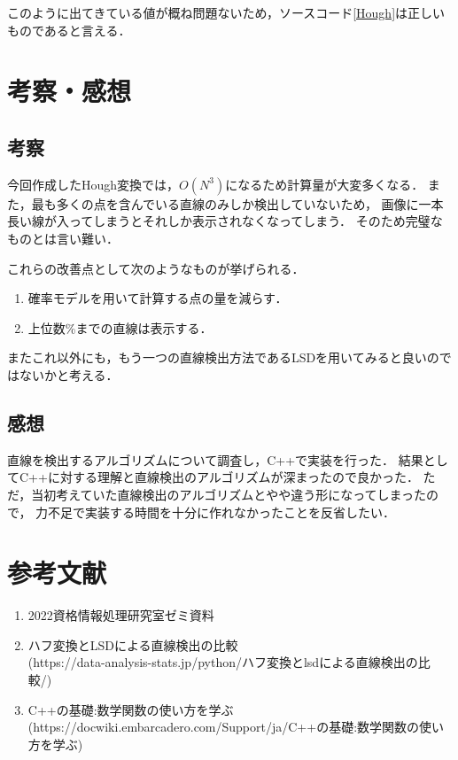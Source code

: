 \documentclass[titlepage]{jarticle}
\begin{document}
このように出てきている値が概ね問題ないため，ソースコード\ref{Hough}は正しいものであると言える．

\section{考察・感想}
\subsection{考察}
今回作成したHough変換では，$O(N^{3})$になるため計算量が大変多くなる．
また，最も多くの点を含んでいる直線のみしか検出していないため，
画像に一本長い線が入ってしまうとそれしか表示されなくなってしまう．
そのため完璧なものとは言い難い．

これらの改善点として次のようなものが挙げられる．
\begin{enumerate}
  \item 確率モデルを用いて計算する点の量を減らす．
  \item 上位数\%までの直線は表示する．
\end{enumerate}

またこれ以外にも，もう一つの直線検出方法であるLSDを用いてみると良いのではないかと考える．

\subsection{感想}
直線を検出するアルゴリズムについて調査し，C++で実装を行った．
結果としてC++に対する理解と直線検出のアルゴリズムが深まったので良かった．
ただ，当初考えていた直線検出のアルゴリズムとやや違う形になってしまったので，
力不足で実装する時間を十分に作れなかったことを反省したい．

\section*{参考文献}
\begin{enumerate}
  \item 2022資格情報処理研究室ゼミ資料
  \item ハフ変換とLSDによる直線検出の比較\\
        (https://data-analysis-stats.jp/python/ハフ変換とlsdによる直線検出の比較/)
  \item C++の基礎:数学関数の使い方を学ぶ\\
        (https://docwiki.embarcadero.com/Support/ja/C++の基礎:数学関数の使い方を学ぶ)
\end{enumerate}
\end{document}
